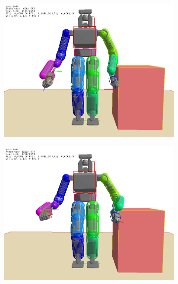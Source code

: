 \documentclass[letterpaper, 10 pt, conference]{ieeeconf}  %
\begin{document}
\begin{figure}[h]
\begin{center}
\begin{subfigure}[h]{0.45\columnwidth}
        \includegraphics[width=\columnwidth]{pictures/mirror_3}
        \label{fig:mirror3}
    \end{subfigure}
    \begin{subfigure}[h]{0.45\columnwidth}
        \includegraphics[width=\columnwidth]{pictures/mirror_4}
        \label{fig:mirror4}
    \end{subfigure}
    \begin{subfigure}[h]{0.45\columnwidth}

\end{subfigure}
\end{center}
\end{figure}
\end{document}
